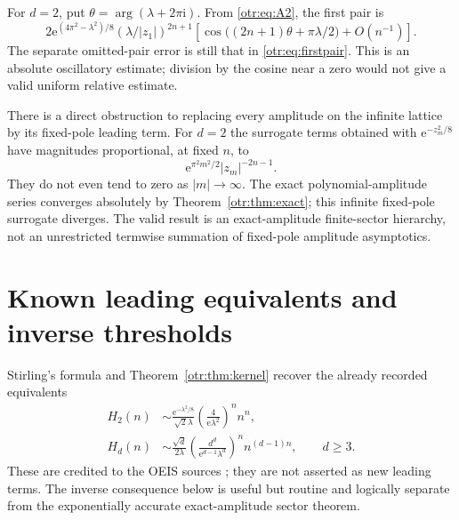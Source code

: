 \documentclass[11pt,a4paper]{article}
\theoremstyle{definition}\newtheorem{definition}[theorem]{Definition}
\theoremstyle{remark}\newtheorem{remark}[theorem]{Remark}
\newcommand{\lam}{\lambda}
\newcommand{\e}{\mathrm e}
\newcommand{\ii}{\mathrm i}
\begin{document}
For $d=2$, put $\theta=\arg(\lam+2\pi\ii)$. From \eqref{otr:eq:A2}, the first pair is
\begin{equation}\label{otr:eq:cosine}
 2\e^{(4\pi^2-\lam^2)/8}(\lam/|z_1|)^{2n+1}
 \left[\cos\bigl((2n+1)\theta+\pi\lam/2\bigr)+O(n^{-1})\right].
\end{equation}
The separate omitted-pair error is still that in \eqref{otr:eq:firstpair}. This is an absolute oscillatory estimate; division by the cosine near a zero would not give a valid uniform relative estimate.

There is a direct obstruction to replacing every amplitude on the infinite lattice by its fixed-pole leading term. For $d=2$ the surrogate terms obtained with $\e^{-z_m^2/8}$ have magnitudes proportional, at fixed $n$, to
\[
 \e^{\pi^2m^2/2}|z_m|^{-2n-1}.
\]
They do not even tend to zero as $|m|\to\infty$. The exact polynomial-amplitude series converges absolutely by Theorem~\ref{otr:thm:exact}; this infinite fixed-pole surrogate diverges. The valid result is an exact-amplitude finite-sector hierarchy, not an unrestricted termwise summation of fixed-pole amplitude asymptotics.

\section{Known leading equivalents and inverse thresholds}
\label{otr:sec:inverse}
Stirling's formula and Theorem~\ref{otr:thm:kernel} recover the already recorded equivalents
\begin{align}
 H_2(n)&\sim\frac{\e^{-\lam^2/8}}{\sqrt2\lam}
              \left(\frac4{\e\lam^2}\right)^n n^n,\label{otr:eq:lead2}\\
 H_d(n)&\sim\frac{\sqrt d}{2\lam}
       \left(\frac{d^d}{\e^{d-1}\lam^d}\right)^n n^{(d-1)n},
       \qquad d\ge3.\label{otr:eq:leadd}
\end{align}
These are credited to the OEIS sources \cite{oeis2,oeis3,oeis4}; they are not asserted as new leading terms. The inverse consequence below is useful but routine and logically separate from the exponentially accurate exact-amplitude sector theorem.
\end{document}
